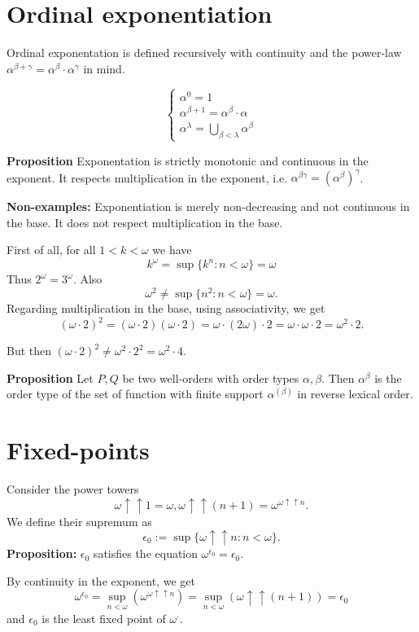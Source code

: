 \section{Ordinal exponentiation}
Ordinal exponentation is defined recursively with continuity and the power-law $\alpha^{\beta + \gamma} = \alpha^\beta \cdot \alpha^\gamma$ in mind.

\[ 
\begin{cases}
	\alpha^0 = 1 \\
	\alpha^{\beta + 1} = \alpha^\beta \cdot \alpha \\
	\alpha^\lambda = \bigcup_{\beta < \lambda} \alpha^\beta
\end{cases}
\]

\textbf{Proposition} Exponentation is strictly monotonic and continuous in the exponent. It respects multiplication in the exponent, i.e. $\alpha^{\beta\gamma} = (\alpha^\beta)^\gamma$.

\textbf{Non-examples: } Exponentiation is merely non-decreasing and not continuous in the base. It does not respect multiplication in the base.

First of all, for all $1 < k < \omega$ we have
\[ k^\omega = \sup \{ k^n : n < \omega \} = \omega \]
Thus $2^\omega = 3^\omega$. Also 
\[ \omega^2 \neq \sup \{ n^2 : n < \omega \} = \omega. \]
Regarding multiplication in the base, using associativity, we get
\[ (\omega \cdot 2)^2 = (\omega \cdot 2)(\omega \cdot 2) = \omega \cdot (2\omega) \cdot 2 = \omega \cdot \omega \cdot 2 = \omega^2 \cdot 2. \]

But then $(\omega \cdot 2)^2 \neq \omega^2 \cdot 2^2 = \omega^2 \cdot 4$. 

\textbf{Proposition}
Let $P,Q$ be two well-orders with order types $\alpha, \beta$. Then $\alpha^\beta$ is the order type of the set of function with finite support $\alpha^{(\beta)}$ in reverse lexical order.

\section{Fixed-points}
Consider the power towers
\[ \omega \uparrow\uparrow 1 = \omega, \omega \uparrow \uparrow (n + 1) = \omega^{\omega \uparrow \uparrow n}. \]
We define their supremum as 
\[ \epsilon_0 := \sup \{ \omega \uparrow \uparrow n : n < \omega \}. \]
\textbf{Proposition: } $\epsilon_0$ satisfies the equation $\omega^{\epsilon_0} = \epsilon_0$.

By continuity in the exponent, we get
\[ \omega^{\epsilon_0} = \sup_{n < \omega} \left(\omega^{\omega \uparrow \uparrow n}\right) = \sup_{n < \omega} (\omega \uparrow \uparrow (n+1)) = \epsilon_0 \]
and $\epsilon_0$ is the least fixed point of $\omega^\cdot$. \\ 

